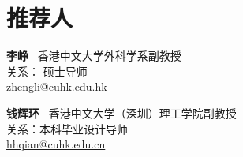\documentclass[utf8, 11pt,letterpaper]{report}
\newcommand{\listitemspace}{0.25em}
\renewenvironment{itemize}
{\begin{list}{}{\setlength{\leftmargin}{0em}
			\setlength{\parskip}{0em}
			\setlength{\itemsep}{\listitemspace}
			\setlength{\parsep}{\listitemspace}}}
	{\end{list}}
\begin{document}
\section*{推荐人}
\begin{itemize}
	\item \textbf{李峥}~ 香港中文大学外科学系副教授\\
	关系： 硕士导师\\
	{\scriptsize \faEnvelope}\href{mailto:zhengli@cuhk.edu.hk}{zhengli@cuhk.edu.hk}

	\vspace{10pt}
	\item \textbf{钱辉环}~ 香港中文大学（深圳）理工学院副教授\\
	关系：本科毕业设计导师\\
	{\scriptsize \faEnvelope}\href{mailto:hhqian@cuhk.edu.cn}{hhqian@cuhk.edu.cn}\\
\end{itemize}
\end{document}
